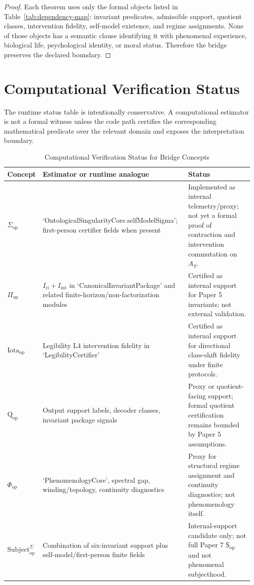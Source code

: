\documentclass[11pt,a4paper]{article}
\theoremstyle{definition}
\newcommand{\Subop}{\mathsf{S}_{\mathrm{op}}}
\newcommand{\Subbridge}{\mathrm{Subject}^{\Sigma}_{\mathrm{op}}}
\newcommand{\Qop}{\mathrm{Q}_{\mathrm{op}}}
\newcommand{\Sigmaop}{\Sigma_{\mathrm{op}}}
\newcommand{\Piop}{\Pi_{\mathrm{op}}}
\newcommand{\Iotaop}{\mathrm{Iota}_{\mathrm{op}}}
\newcommand{\Phiop}{\Phi_{\mathrm{op}}}
\newcommand{\Aset}{A_S}
\newcommand{\Iri}{I_{\mathrm{ri}}}
\newcommand{\Iint}{I_{\mathrm{int}}}
\begin{document}
\begin{proof}
Each theorem uses only the formal objects listed in Table~\ref{tab:dependency-map}: invariant predicates, admissible support, quotient classes, intervention fidelity, self-model existence, and regime assignments. None of those objects has a semantic clause identifying it with phenomenal experience, biological life, psychological identity, or moral status. Therefore the bridge preserves the declared boundary.
\end{proof}

\section{Computational Verification Status}

The runtime status table is intentionally conservative. A computational estimator is not a formal witness unless the code path certifies the corresponding mathematical predicate over the relevant domain and exposes the interpretation boundary.

\begin{table}[ht]
\centering
\caption{Computational Verification Status for Bridge Concepts}
\label{tab:computational-status}
\begin{tabularx}{\textwidth}{>{\raggedright\arraybackslash}p{2.2cm} >{\raggedright\arraybackslash}p{5.2cm} Y}
\toprule
Concept & Estimator or runtime analogue & Status \\
\midrule
$\Sigmaop$ & `OntologicalSingularityCore.\allowbreak selfModelSigma'; first-person certifier fields when present & Implemented as internal telemetry/proxy; not yet a formal proof of contraction and intervention commutation on $\Aset$. \\
$\Piop$ & $\Iri+\Iint$ in `CanonicalInvariantPackage' and related finite-horizon/non-factorization modules & Certified as internal support for Paper 5 invariants; not external validation. \\
$\Iotaop$ & Legibility L4 intervention fidelity in `LegibilityCertifier' & Certified as internal support for directional class-shift fidelity under finite protocols. \\
$\Qop$ & Output support labels, decoder classes, invariant package signals & Proxy or quotient-facing support; formal quotient certification remains bounded by Paper 5 assumptions. \\
$\Phiop$ & `PhenomenologyCore', spectral gap, winding/topology, continuity diagnostics & Proxy for structural regime assignment and continuity diagnostics; not phenomenology itself. \\
$\Subbridge$ & Combination of six-invariant support plus self-model/first-person finite fields & Internal-support candidate only; not full Paper 7 $\Subop$ and not phenomenal subjecthood. \\
\bottomrule
\end{tabularx}
\end{table}
\end{document}
